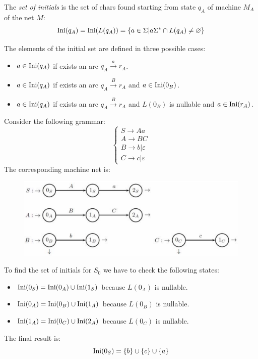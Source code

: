 \begin{definition}
    The \emph{set of initials} is the set of chars found starting from state $q_A$ of machine $M_A$ of the net $M$: 
    \[\textnormal{Ini}(q_A)=\textnormal{Ini}(L(q_A))=\{a \in \Sigma|a\Sigma^{*}\cap L(q_A) \neq \varnothing\}\]
\end{definition}
The elements of the initial set are defined in three possible cases: 
\begin{itemize}
    \item $a \in \textnormal{Ini}(q_A)$ if exists an arc $q_A \overset{a}{\rightarrow}r_A$. 
    \item $a \in \textnormal{Ini}(q_A)$ if exists an arc $q_A \overset{B}{\rightarrow}r_A$ and $a \in \textnormal{Ini}(0_B)$. 
    \item $a \in \textnormal{Ini}(q_A)$ if exists an arc $q_A \overset{B}{\rightarrow}r_A$ and $L(0_B)$ is nullable and $a \in \textnormal{Ini}(r_A)$.
\end{itemize}
\begin{example}
    Consider the following grammar: 
    \[
    \begin{cases}
        S \rightarrow Aa \\
        A \rightarrow BC \\
        B \rightarrow b|\varepsilon \\
        C \rightarrow c|\varepsilon
    \end{cases}    
    \]
    The corresponding machine net is: 
    \begin{figure}[H]
        \centering
        \includegraphics[width=0.5\linewidth]{images/net1.png}
    \end{figure}
    To find the set of initials for $S_0$ we have to check the following states: 
    \begin{itemize}
        \item $\textnormal{Ini}(0_S)=\textnormal{Ini}(0_A) \cup \textnormal{Ini}(1_S)$ because $L(0_A)$ is nullable. 
        \item $\textnormal{Ini}(0_A)=\textnormal{Ini}(0_B) \cup \textnormal{Ini}(1_A)$ because $L(0_B)$ is nullable. 
        \item $\textnormal{Ini}(1_A)=\textnormal{Ini}(0_C) \cup \textnormal{Ini}(2_A)$ because $L(0_C)$ is nullable. 
    \end{itemize}
    The final result is: 
    \[\textnormal{Ini}(0_S)=\{b\} \cup \{c\} \cup \{a\}\]
\end{example}

